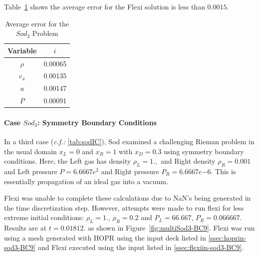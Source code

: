Table~\ref{tab:sod2Eps} shows the average error for the Flexi solution is less than $0.0015$.

\begin{table}[h!]
 \centering
 \begin{tabular}{|c|c|} \hline
   Variable & $\bar{\epsilon}$ \\ \hline \hline
   $\rho$ & 0.00065 \\
   $v_x$  & 0.00135 \\
   $u$     & 0.00147 \\
   $P$     & 0.00091 \\ \hline
 \end{tabular}
 \caption{Average error for the $Sod_2$ Problem}\label{tab:sod2Eps}
\end{table}

\paragraph{Case $Sod_3$: Symmetry Boundary Conditions}

In a third case (\textit{c.f.:} \ref{tab:sodIC}), Sod examined a challenging Rieman problem in the usual domain $x_L = 0$ and $x_R = 1$ with $x_D = 0.3$ using symmetry boundary conditions.  Here, the Left gas has density $\rho_L = 1.,$ and Right density $\rho_R = 0.001$ and Left pressure $P = 6.6667e^{2}$ and Right pressure $P_R = 6.6667e{-6}$.  This is essentially propagation of an ideal gas into a vacuum.

Flexi was unable to complete these calculations due to NaN's being generated in the time discretization step.  However, attempts were made to run flexi for less extreme initial conditions: $\rho_L = 1.$, $\rho_R = 0.2$ and $P_L = 66.667$, $P_R = 0.066667$. Results are at $t = 0.01812$.  as shown in Figure~\ref{fig:multiSod3-BC9}. Flexi was run using a mesh generated with HOPR using the input deck listed in \ref{ssec:hoprin-sod3-BC9} and Flexi executed using the input listed in \ref{ssec:flexiin-sod3-BC9}.

